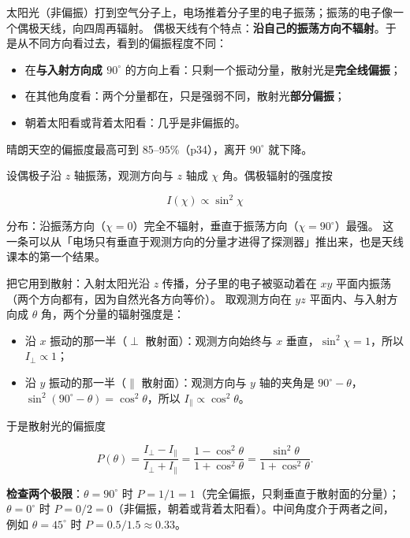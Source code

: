 \documentclass[11pt]{ctexart}
\let\subhdrtheme\subhdr
\renewcommand{\subhdr}[1]{\needspace{4\baselineskip}\subhdrtheme{#1}}
\let\hdrorig\hdr
\renewcommand{\hdr}[2]{\needspace{8\baselineskip}\hdrorig{#1}{#2}}
\begin{document}


太阳光（非偏振）打到空气分子上，电场推着分子里的电子振荡；振荡的电子像一个偶极天线，向四周再辐射。
偶极天线有个特点：\textbf{沿自己的振荡方向不辐射}。于是从不同方向看过去，看到的偏振程度不同：

\begin{itemize}
\item 在\textbf{与入射方向成 $90^\circ$} 的方向上看：只剩一个振动分量，散射光是\textbf{完全线偏振}；
\item 在其他角度看：两个分量都在，只是强弱不同，散射光\textbf{部分偏振}；
\item 朝着太阳看或背着太阳看：几乎是非偏振的。
\end{itemize}

晴朗天空的偏振度最高可到 85--95\%（p34），离开 $90^\circ$ 就下降。


设偶极子沿 $z$ 轴振荡，观测方向与 $z$ 轴成 $\chi$ 角。偶极辐射的强度按

\[
I(\chi)\propto\sin^2\chi
\]

分布：沿振荡方向（$\chi=0$）完全不辐射，垂直于振荡方向（$\chi=90^\circ$）最强。
这一条可以从「电场只有垂直于观测方向的分量才进得了探测器」推出来，也是天线课本的第一个结果。

把它用到散射：入射太阳光沿 $z$ 传播，分子里的电子被驱动着在 $xy$ 平面内振荡（两个方向都有，因为自然光各方向等价）。
取观测方向在 $yz$ 平面内、与入射方向成 $\theta$ 角，两个分量的辐射强度是：

\begin{itemize}[leftmargin=1.8em]
\item 沿 $x$ 振动的那一半（$\perp$ 散射面）：观测方向始终与 $x$ 垂直，$\sin^2\chi=1$，所以 $I_\perp\propto1$；
\item 沿 $y$ 振动的那一半（$\parallel$ 散射面）：观测方向与 $y$ 轴的夹角是 $90^\circ-\theta$，
$\sin^2(90^\circ-\theta)=\cos^2\theta$，所以 $I_\parallel\propto\cos^2\theta$。
\end{itemize}

于是散射光的偏振度

\[
P(\theta)=\frac{I_\perp-I_\parallel}{I_\perp+I_\parallel}
=\frac{1-\cos^2\theta}{1+\cos^2\theta}
=\frac{\sin^2\theta}{1+\cos^2\theta}.
\]

\textbf{检查两个极限}：$\theta=90^\circ$ 时 $P=1/1=1$（完全偏振，只剩垂直于散射面的分量）；
$\theta=0^\circ$ 时 $P=0/2=0$（非偏振，朝着或背着太阳看）。中间角度介于两者之间，例如
$\theta=45^\circ$ 时 $P=0.5/1.5\approx0.33$。
\end{document}
